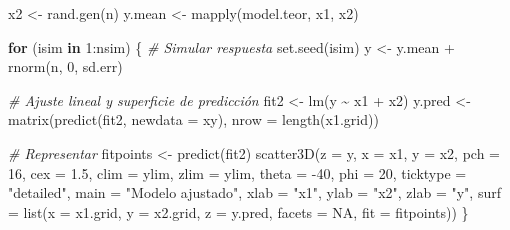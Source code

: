 \documentclass[
  spanish,
]{book}
\newenvironment{Shaded}{\begin{snugshade}}{\end{snugshade}}
\newcommand{\AttributeTok}[1]{\textcolor[rgb]{0.77,0.63,0.00}{#1}}
\newcommand{\CommentTok}[1]{\textcolor[rgb]{0.56,0.35,0.01}{\textit{#1}}}
\newcommand{\ConstantTok}[1]{\textcolor[rgb]{0.00,0.00,0.00}{#1}}
\newcommand{\ControlFlowTok}[1]{\textcolor[rgb]{0.13,0.29,0.53}{\textbf{#1}}}
\newcommand{\DecValTok}[1]{\textcolor[rgb]{0.00,0.00,0.81}{#1}}
\newcommand{\FloatTok}[1]{\textcolor[rgb]{0.00,0.00,0.81}{#1}}
\newcommand{\FunctionTok}[1]{\textcolor[rgb]{0.00,0.00,0.00}{#1}}
\newcommand{\NormalTok}[1]{#1}
\newcommand{\OtherTok}[1]{\textcolor[rgb]{0.56,0.35,0.01}{#1}}
\newcommand{\SpecialCharTok}[1]{\textcolor[rgb]{0.00,0.00,0.00}{#1}}
\newcommand{\StringTok}[1]{\textcolor[rgb]{0.31,0.60,0.02}{#1}}
\theoremstyle{break}
\theoremstyle{definition}
\theoremstyle{definition}
\theoremstyle{definition}
\theoremstyle{definition}
\theoremstyle{remark}
\begin{document}
\begin{Shaded}
\begin{Highlighting}[]
\NormalTok{x2 }\OtherTok{\textless{}{-}} \FunctionTok{rand.gen}\NormalTok{(n)}
\NormalTok{y.mean }\OtherTok{\textless{}{-}} \FunctionTok{mapply}\NormalTok{(model.teor, x1, x2)}

\ControlFlowTok{for}\NormalTok{ (isim }\ControlFlowTok{in} \DecValTok{1}\SpecialCharTok{:}\NormalTok{nsim) \{}
  \CommentTok{\# Simular respuesta}
  \FunctionTok{set.seed}\NormalTok{(isim)}
\NormalTok{  y }\OtherTok{\textless{}{-}}\NormalTok{ y.mean }\SpecialCharTok{+} \FunctionTok{rnorm}\NormalTok{(n, }\DecValTok{0}\NormalTok{, sd.err)}
  
  \CommentTok{\# Ajuste lineal y superficie de predicción}
\NormalTok{  fit2 }\OtherTok{\textless{}{-}} \FunctionTok{lm}\NormalTok{(y }\SpecialCharTok{\textasciitilde{}}\NormalTok{ x1 }\SpecialCharTok{+}\NormalTok{ x2)}
\NormalTok{  y.pred }\OtherTok{\textless{}{-}} \FunctionTok{matrix}\NormalTok{(}\FunctionTok{predict}\NormalTok{(fit2, }\AttributeTok{newdata =}\NormalTok{ xy), }\AttributeTok{nrow =} \FunctionTok{length}\NormalTok{(x1.grid)) }
  
  \CommentTok{\# Representar}
\NormalTok{  fitpoints }\OtherTok{\textless{}{-}} \FunctionTok{predict}\NormalTok{(fit2) }
  \FunctionTok{scatter3D}\NormalTok{(}\AttributeTok{z =}\NormalTok{ y, }\AttributeTok{x =}\NormalTok{ x1, }\AttributeTok{y =}\NormalTok{ x2, }\AttributeTok{pch =} \DecValTok{16}\NormalTok{, }\AttributeTok{cex =} \FloatTok{1.5}\NormalTok{, }\AttributeTok{clim =}\NormalTok{ ylim, }\AttributeTok{zlim =}\NormalTok{ ylim,}
            \AttributeTok{theta =} \SpecialCharTok{{-}}\DecValTok{40}\NormalTok{, }\AttributeTok{phi =} \DecValTok{20}\NormalTok{, }\AttributeTok{ticktype =} \StringTok{"detailed"}\NormalTok{, }
            \AttributeTok{main =} \StringTok{"Modelo ajustado"}\NormalTok{, }\AttributeTok{xlab =} \StringTok{"x1"}\NormalTok{, }\AttributeTok{ylab =} \StringTok{"x2"}\NormalTok{, }\AttributeTok{zlab =} \StringTok{"y"}\NormalTok{, }
            \AttributeTok{surf =} \FunctionTok{list}\NormalTok{(}\AttributeTok{x =}\NormalTok{ x1.grid, }\AttributeTok{y =}\NormalTok{ x2.grid, }\AttributeTok{z =}\NormalTok{ y.pred, }
                        \AttributeTok{facets =} \ConstantTok{NA}\NormalTok{, }\AttributeTok{fit =}\NormalTok{ fitpoints))}
\NormalTok{\}}
\end{Highlighting}
\end{Shaded}
\end{document}
